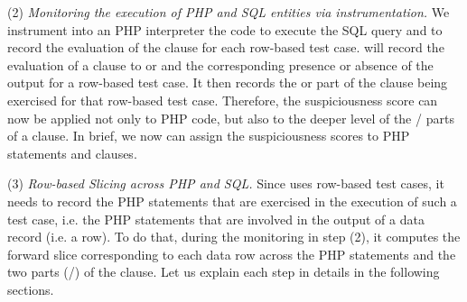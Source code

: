 
(2) {\em Monitoring the execution of PHP and SQL entities via
  instrumentation.} We instrument into an PHP interpreter the code to
execute the SQL query and to record the evaluation of the 
clause for each row-based test case. {\tool} will record the
evaluation of a  clause to  or  and
the corresponding presence or absence of the output for a row-based
test case. It then records the  or  part of the
 clause being exercised for that row-based test case.
Therefore, the suspiciousness score can now be applied not only to PHP
code, but also to the deeper level of the /
parts of a  clause. In brief, we now can assign the
suspiciousness scores to PHP statements and  clauses.



(3) {\em Row-based Slicing across PHP and SQL.} Since {\tool} uses
row-based test cases, it needs to record the PHP statements that are
exercised in the execution of such a test case, i.e. the PHP
statements that are involved in the output of a data record (i.e. a
row). To do that, during the monitoring in step (2), it computes the
forward slice corresponding to each data row across the PHP statements
and the two parts (/) of the 
clause.
Let us explain each step in details in the following sections.

